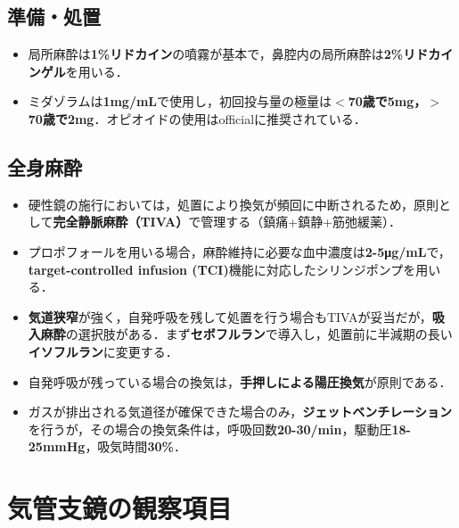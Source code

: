 \subsection{準備・処置}
\begin{itemize}

\item 局所麻酔は\textbf{1\%リドカイン}の噴霧が基本で，鼻腔内の局所麻酔は\textbf{2\%リドカインゲル}を用いる．
\item ミダゾラムは\textbf{1mg/mL}で使用し，初回投与量の極量は\textbf{$<$70歳で5mg，$>$70歳で2mg}．オピオイドの使用はofficialに推奨されている．
\end{itemize}

\subsection{全身麻酔}
\begin{itemize}

\item 硬性鏡の施行においては，処置により換気が頻回に中断されるため，原則として\textbf{完全静脈麻酔（TIVA）}で管理する（鎮痛+鎮静+筋弛緩薬）．
\item プロポフォールを用いる場合，麻酔維持に必要な血中濃度は\textbf{2-5μg/mL}で，\textbf{target-controlled infusion (TCI)}機能に対応したシリンジポンプを用いる．
\item \textbf{気道狭窄}が強く，自発呼吸を残して処置を行う場合もTIVAが妥当だが，\textbf{吸入麻酔}の選択肢がある．まず\textbf{セボフルラン}で導入し，処置前に半減期の長い\textbf{イソフルラン}に変更する．
\item 自発呼吸が残っている場合の換気は，\textbf{手押しによる陽圧換気}が原則である．
\item ガスが排出される気道径が確保できた場合のみ，\textbf{ジェットベンチレーション}を行うが，その場合の換気条件は，呼吸回数\textbf{20-30/min}，駆動圧\textbf{18-25mmHg}，吸気時間\textbf{30\%}．

\end{itemize}

\newpage
\section{気管支鏡の観察項目}
